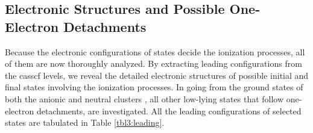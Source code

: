 \begin{refsection}
\subsection{Electronic Structures and Possible One-Electron Detachments}




Because the electronic configurations of states decide the ionization processes, all of them are now thoroughly analyzed. By extracting leading configurations from the \acrshort{casscf} levels, we reveal the detailed electronic structures of possible initial and final states involving the ionization processes. In going from the ground states of both the anionic and neutral clusters , all other low-lying states that follow one-electron detachments, are investigated. All the leading configurations of selected states are tabulated in Table \ref{tbl3:leading}.



\end{refsection}
